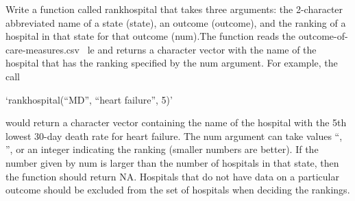 \documentclass[
]{article}
\begin{document}
Write a function called rankhospital that takes three arguments: the
2-character abbreviated name of a state (state), an outcome (outcome),
and the ranking of a hospital in that state for that outcome (num).The
function reads the outcome-of-care-measures.csv  le and returns a
character vector with the name of the hospital that has the ranking
specified by the num argument. For example, the call

`rankhospital(``MD'', ``heart failure'', 5)'

would return a character vector containing the name of the hospital with
the 5th lowest 30-day death rate for heart failure. The num argument can
take values \best``, \worst'', or an integer indicating the ranking
(smaller numbers are better). If the number given by num is larger than
the number of hospitals in that state, then the function should return
NA. Hospitals that do not have data on a particular outcome should be
excluded from the set of hospitals when deciding the rankings.
\end{document}
